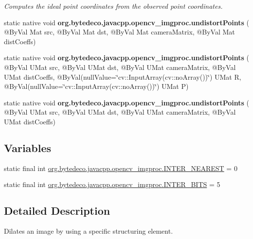 \begin{DoxyCompactItemize}
\begin{DoxyCompactList}\small\item\em Computes the ideal point coordinates from the observed point coordinates. \end{DoxyCompactList}\item 
\mbox{\label{group__imgproc__transform_ga643d90bd3869339b2e1a72640791859d}} 
static native void {\bfseries org.\+bytedeco.\+javacpp.\+opencv\+\_\+imgproc.\+undistort\+Points} ( @By\+Val Mat src, @By\+Val Mat dst, @By\+Val Mat camera\+Matrix, @By\+Val Mat dist\+Coeffs)
\item 
\mbox{\label{group__imgproc__transform_ga7105e7a0bb64b7cd322241162fe27e1f}} 
static native void {\bfseries org.\+bytedeco.\+javacpp.\+opencv\+\_\+imgproc.\+undistort\+Points} ( @By\+Val U\+Mat src, @By\+Val U\+Mat dst, @By\+Val U\+Mat camera\+Matrix, @By\+Val U\+Mat dist\+Coeffs, @By\+Val(null\+Value=\char`\"{}cv\+::\+Input\+Array(cv\+::no\+Array())\char`\"{}) U\+Mat R, @By\+Val(null\+Value=\char`\"{}cv\+::\+Input\+Array(cv\+::no\+Array())\char`\"{}) U\+Mat P)
\item 
\mbox{\label{group__imgproc__transform_ga40062a82e0bac148d8b183c5e2d6eaec}} 
static native void {\bfseries org.\+bytedeco.\+javacpp.\+opencv\+\_\+imgproc.\+undistort\+Points} ( @By\+Val U\+Mat src, @By\+Val U\+Mat dst, @By\+Val U\+Mat camera\+Matrix, @By\+Val U\+Mat dist\+Coeffs)
\end{DoxyCompactItemize}
\subsection*{Variables}
\begin{DoxyCompactItemize}
\item 
static final int \hyperlink{group__imgproc__transform_ga6d084cc56ec2d2c46a7df1a2c0dad300}{org.\+bytedeco.\+javacpp.\+opencv\+\_\+imgproc.\+I\+N\+T\+E\+R\+\_\+\+N\+E\+A\+R\+E\+ST} = 0
\item 
static final int \hyperlink{group__imgproc__transform_ga076a64e7bcb513b6ff755fccecf7d4bf}{org.\+bytedeco.\+javacpp.\+opencv\+\_\+imgproc.\+I\+N\+T\+E\+R\+\_\+\+B\+I\+TS} = 5
\end{DoxyCompactItemize}


\subsection{Detailed Description}
Dilates an image by using a specific structuring element. 

